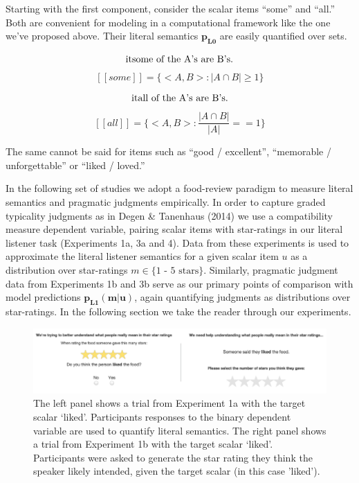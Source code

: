 \documentclass[10pt, letterpaper]{article}
\newenvironment{CodeChunk}{}{}
\begin{document}
Starting with the first component, consider the scalar items ``some''
and ``all.'' Both are convenient for modeling in a computational
framework like the one we've proposed above. Their literal semantics
\(\mathbf{p_{L0}}\) are easily quantified over sets.

\[\text{\text it{some of the A's are B's.}}\]
\[[[some]] = \{<A, B> : |A \cap B| \geq 1 \}\]

\[\text{\text it{all of the A's are B's.}}\]
\[[[all]] = \{<A, B> : \frac{|A \cap B|}{|A|} == 1 \}\]

The same cannot be said for items such as ``good / excellent'',
``memorable / unforgettable'' or ``liked / loved.''

In the following set of studies we adopt a food-review paradigm to
measure literal semantics and pragmatic judgments empirically. In order
to capture graded typicality judgments as in Degen \& Tanenhaus (2014)
we use a compatibility measure dependent variable, pairing scalar items
with star-ratings in our literal listener task (Experiments 1a, 3a and
4). Data from these experiments is used to approximate the literal
listener semantics for a given scalar item \(u\) as a distribution over
star-ratings \(m \in \text{\{1 - 5 stars\}}\). Similarly, pragmatic
judgment data from Experiments 1b and 3b serve as our primary points of
comparison with model predictions \(\mathbf{p_{L1}(m|u)}\), again
quantifying judgments as distributions over star-ratings. In the
following section we take the reader through our experiments.

\begin{CodeChunk}
\captionsetup{width=0.8\textwidth}\begin{figure}[t]

{\centering \includegraphics{figs/stimuli_exp1-1} 

}

\caption[The left panel shows a trial from Experiment 1a with the target scalar `liked']{The left panel shows a trial from Experiment 1a with the target scalar `liked'. Participants responses to the binary dependent variable are used to quantify literal semantics. The right panel shows a trial from Experiment 1b with the target scalar `liked'. Participants were asked to generate the star rating they think the speaker likely intended, given the target scalar (in this case 'liked').}\label{fig:stimuli_exp1}
\end{figure}
\end{CodeChunk}
\end{document}
